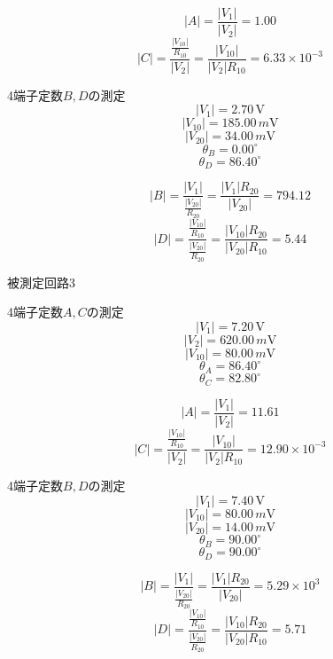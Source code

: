 \begin{description}
\begin{description}
            $$
            |A|=\frac{\left|V_1\right|}{\left|V_2\right|}=1.00
            $$
            $$
            |C|=\frac{\frac{\left|V_{10}\right|}{R_{10}}}{\left|V_2\right|}=\frac{\left|V_{10}\right|}{\left|V_2\right| R_{10}}=6.33\times10^{-3}
            $$

            \item 4端子定数$B,D$の測定
            $$
            |V_1|=2.70\,\si{\volt}
            $$
            $$
            |V_{10}|=185.00\,\si{m\volt}
            $$
            $$
            |V_{20}|=34.00\,\si{m\volt}
            $$
            $$
            \theta_B=0.00^\circ
            $$
            $$
            \theta_D=86.40^\circ
            $$

            $$
            |B|=\frac{\left|V_1\right|}{\frac{\left|V_{20}\right|}{R_{20}}}=\frac{\left|V_1\right| R_{20}}{\left|V_{20}\right|}=794.12
            $$
            $$
            |D|=\frac{\frac{\left|V_{10}\right|}{R_{10}}}{\frac{\left|V_{20}\right|}{R_{20}}}=\frac{\left|V_{10}\right| R_{20}}{\left|V_{20}\right| R_{10}}=5.44
            $$
        \end{description}

        \newpage
        
        \item 被測定回路3
        \begin{description}
            \item 4端子定数$A,C$の測定
            $$
            |V_1|=7.20\,\si{\volt}
            $$
            $$
            |V_2|=620.00\,\si{m\volt}
            $$
            $$
            |V_{10}|=80.00\,\si{m\volt}
            $$
            $$
            \theta_A=86.40^\circ
            $$
            $$
            \theta_C=82.80^\circ
            $$

            $$
            |A|=\frac{\left|V_1\right|}{\left|V_2\right|}=11.61
            $$
            $$
            |C|=\frac{\frac{\left|V_{10}\right|}{R_{10}}}{\left|V_2\right|}=\frac{\left|V_{10}\right|}{\left|V_2\right| R_{10}}=12.90\times10^{-3}
            $$

            \item 4端子定数$B,D$の測定
            $$
            |V_1|=7.40\,\si{\volt}
            $$
            $$
            |V_{10}|=80.00\,\si{m\volt}
            $$
            $$
            |V_{20}|=14.00\,\si{m\volt}
            $$
            $$
            \theta_B=90.00^\circ
            $$
            $$
            \theta_D=90.00^\circ
            $$

            $$
            |B|=\frac{\left|V_1\right|}{\frac{\left|V_{20}\right|}{R_{20}}}=\frac{\left|V_1\right| R_{20}}{\left|V_{20}\right|}=5.29\times10^3
            $$
            $$
            |D|=\frac{\frac{\left|V_{10}\right|}{R_{10}}}{\frac{\left|V_{20}\right|}{R_{20}}}=\frac{\left|V_{10}\right| R_{20}}{\left|V_{20}\right| R_{10}}=5.71
            $$
        \end{description}
    \end{description}